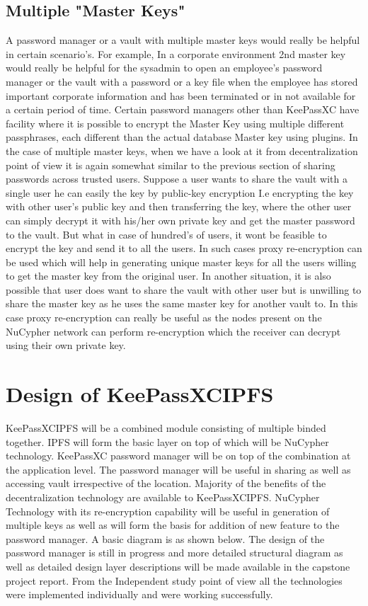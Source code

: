 \documentclass[12pt]{article}
\begin{document}
\subsection{Multiple "Master Keys"}


A password manager or a vault with multiple master keys would really be helpful in certain scenario’s. For example, In a corporate environment 2nd master key would really be helpful for the sysadmin to open an employee’s password manager or the vault with a password or a key file when the employee has stored important corporate information and has been terminated or in not available for a certain period of time. Certain password managers other than KeePassXC have facility where it is possible to encrypt the Master Key using multiple different passphrases, each different than the actual database Master key using plugins. In the case of multiple master keys, when we have a look at it from decentralization point of view it is again somewhat similar to the previous section of sharing passwords across trusted users. Suppose a user wants to share the vault with a single user he can easily the key by public-key encryption I.e encrypting the key with other user’s public key and then transferring the key, where the other user can simply decrypt it with his/her own private key and get the master password to the vault. But what in case of hundred’s of users, it wont be feasible to encrypt the key and send it to all the users. In such cases proxy re-encryption can be used which will help in generating unique master keys for all the users willing to get the master key from the original user. In another situation, it is also possible that user does want to share the vault with other user but is unwilling to share the master key as he uses the same master key for another vault to. In this case proxy re-encryption can really be useful as the nodes present on the NuCypher network can perform re-encryption which the receiver can decrypt using their own private key.   



\section{Design of KeePassXCIPFS}

KeePassXCIPFS will be a combined module consisting of multiple  binded together. IPFS will form the basic layer on top of which will be NuCypher technology. KeePassXC password manager will be on top of the combination  at the application level. The password manager will be useful in sharing as well as accessing vault irrespective of the location. Majority of the benefits of the decentralization technology are available to KeePassXCIPFS.  NuCypher Technology with its re-encryption capability will be useful in generation of multiple keys as well as will form the basis for addition of new feature to the password manager. A basic diagram is as shown below. The design of the password manager is still in progress and more detailed structural diagram as well as detailed design layer descriptions will be made available in the capstone project report. From the Independent study point of view all the technologies were implemented individually and were working successfully.
\end{document}
